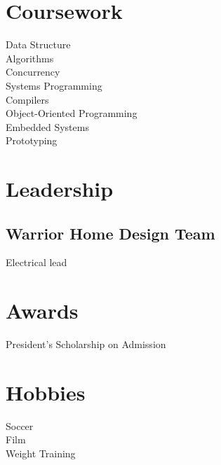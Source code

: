 \documentclass[]{hieudo-build}
\begin{document}
\begin{minipage}[t]{0.34\textwidth}
\section{Coursework}
Data Structure \\
Algorithms \\
Concurrency \\
Systems Programming \\
Compilers \\
Object-Oriented Programming\\
Embedded Systems \\
Prototyping  \\

\sectionsep

\section{Leadership}
\subsection{Warrior Home Design Team}
Electrical lead \\
\sectionsep


\section{Awards} 
President’s Scholarship on Admission\\
\sectionsep

\section{Hobbies} 
Soccer\\
Film \\
Weight Training \\
\sectionsep

\sectionsep
{}

%
%
\end{minipage} 
\hfill
\end{document}
